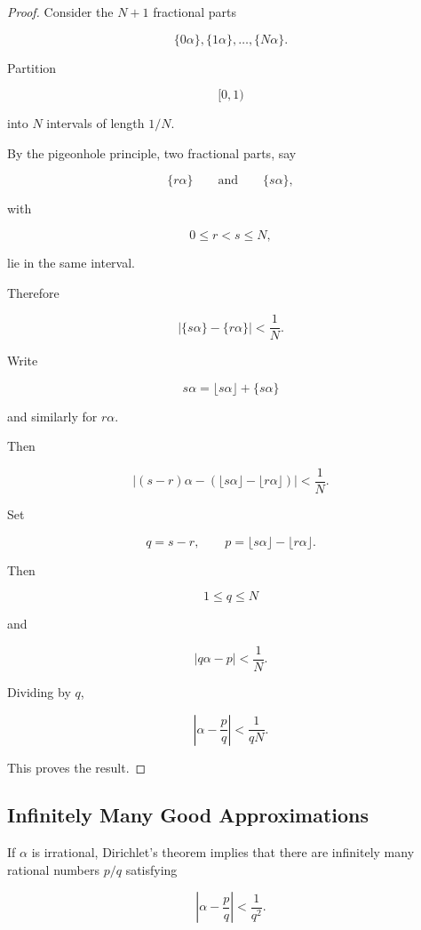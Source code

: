 \begin{proof}
Consider the \(N+1\) fractional parts

\[ \{0\alpha\},\{1\alpha\},\ldots,\{N\alpha\}. \]

Partition

\[ [0,1) \]

into \(N\) intervals of length \(1/N\).

By the pigeonhole principle, two fractional parts, say

\[ \{r\alpha\}\qquad\text{and}\qquad\{s\alpha\}, \]

with

\[ 0\leq r<s\leq N, \]

lie in the same interval.

Therefore

\[ |\{s\alpha\}-\{r\alpha\}|<\frac1N. \]

Write

\[ s\alpha=\lfloor s\alpha\rfloor+\{s\alpha\} \]

and similarly for \(r\alpha\).

Then

\[
|(s-r)\alpha-(\lfloor s\alpha\rfloor-\lfloor r\alpha\rfloor)|
<\frac1N.
\]

Set

\[ q=s-r,\qquad p=\lfloor s\alpha\rfloor-\lfloor r\alpha\rfloor. \]

Then

\[ 1\leq q\leq N \]

and

\[ |q\alpha-p|<\frac1N. \]

Dividing by \(q\),

\[ \left|\alpha-\frac pq\right|<\frac1{qN}. \]

This proves the result.
\end{proof}

\subsection{Infinitely Many Good Approximations}
\label{subsec:infinitely-many-good-rational-approximations}

If \(\alpha\) is irrational, Dirichlet's theorem implies that there are
infinitely many rational numbers \(p/q\) satisfying

\[ \boxed{\left|\alpha-\frac pq\right|<\frac1{q^2}.} \]

